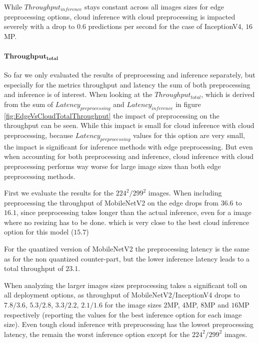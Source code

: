 While $Throughput_{inference}$ stays constant across all images sizes for edge preprocessing options, cloud inference with cloud preprocessing is impacted severely with a drop to $0.6$ predictions per second for the case of InceptionV4, $16$MP.


\paragraph{$\mathbf{Throughput_{total}}$}
So far we only evaluated the results of preprocessing and inference separately, but especially for the metrics throughput and latency the sum of both preprocessing and inference is of interest.%
When looking at the $Throughput_{total}$, which is derived from the sum of $Latency_{preprocessing}$ and $Latency_{inference}$ in figure \ref{fig:EdgeVsCloudTotalThroughput} the impact of preprocessing on the throughput can be seen.
While this impact is small for cloud inference with cloud preprocessing, because $Latency_{preprocessing}$ values for this option are very small, the impact is significant for inference methods with edge preprocessing.
But even when accounting for both preprocessing and inference, cloud inference with cloud preprocessing performs way worse for large image sizes than both edge preprocessing methods.

First we evaluate the results for the $224^2/299^2$ images.
When including preprocessing  the throughput of MobileNetV2 on the edge drops from $36.6$ to $16.1$, since preprocessing takes longer than the actual inference, even for a image where no resizing has to be done.
which is very close to the best cloud inference option for this model ($15.7$)

For the quantized version of MobileNetV2 the preprocessing latency is the same as for the non quantized counter-part, but the lower inference latency leads to a total throughput of $23.1$.

When analyzing the larger images sizes preprocessing takes a significant toll on all deployment options, as throughput of MobileNetV2/InceptionV4 drops to $7.8/3.6$, $5.3/2.8$, $3.3/2.2$, $2.1/1.6$ for the image sizes $2$MP, $4$MP, $8$MP and $16$MP respectively (reporting the values for the best inference option for each image size).
Even tough cloud inference with preprocessing has the lowest preprocessing latency, the remain the worst inference option except for the $224^2/299^2$ images.

